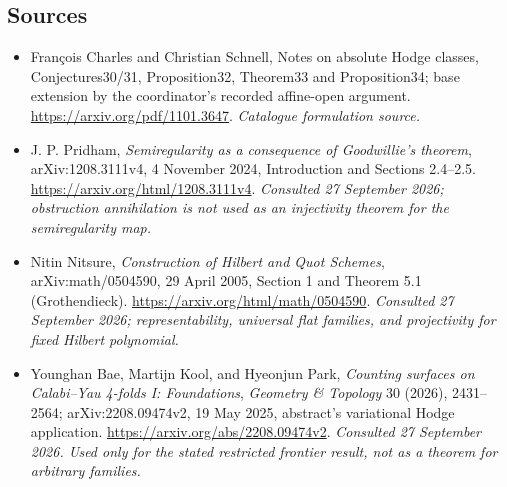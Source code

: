 \documentclass[11pt,a4paper]{article}
\numberwithin{equation}{section}
\begin{document}
\subsection{Sources}
\begin{itemize}\raggedright
\item[\textnormal{[S1]}]\hypertarget{source:157:1}{} François Charles and Christian Schnell, Notes on absolute Hodge classes, Conjectures30/31, Proposition32, Theorem33 and Proposition34; base extension by the coordinator's recorded affine-open argument.
\url{https://arxiv.org/pdf/1101.3647}.
{\small\textit{Catalogue formulation source.}}
\item[\textnormal{[E1]}]\hypertarget{extra:157:1}{} J. P. Pridham,
\emph{Semiregularity as a consequence of Goodwillie's theorem},
arXiv:1208.3111v4, 4 November 2024, Introduction and Sections 2.4--2.5.
\url{https://arxiv.org/html/1208.3111v4}.
{\small\textit{Consulted 27 September 2026; obstruction annihilation is not
used as an injectivity theorem for the semiregularity map.}}
\item[\textnormal{[E2]}]\hypertarget{extra:157:2}{} Nitin Nitsure,
\emph{Construction of Hilbert and Quot Schemes}, arXiv:math/0504590,
29 April 2005, Section 1 and Theorem 5.1 (Grothendieck).
\url{https://arxiv.org/html/math/0504590}.
{\small\textit{Consulted 27 September 2026; representability, universal
flat families, and projectivity for fixed Hilbert polynomial.}}
\item[\textnormal{[E3]}]\hypertarget{extra:157:3}{} Younghan Bae, Martijn Kool,
and Hyeonjun Park, \emph{Counting surfaces on Calabi--Yau 4-folds I:
Foundations}, \emph{Geometry \& Topology} 30 (2026), 2431--2564;
arXiv:2208.09474v2, 19 May 2025, abstract's variational Hodge application.
\url{https://arxiv.org/abs/2208.09474v2}.
{\small\textit{Consulted 27 September 2026. Used only for the stated
restricted frontier result, not as a theorem for arbitrary families.}}
\end{itemize}
\end{document}
